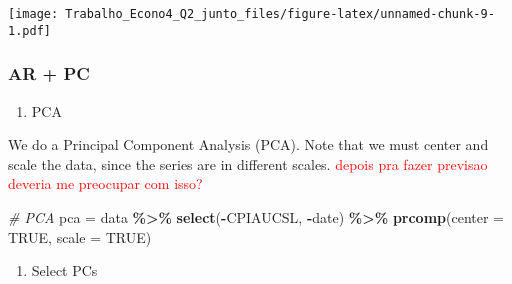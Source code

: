 \documentclass[
]{article}
\newenvironment{Shaded}{\begin{snugshade}}{\end{snugshade}}
\newcommand{\AttributeTok}[1]{\textcolor[rgb]{0.13,0.29,0.53}{#1}}
\newcommand{\CommentTok}[1]{\textcolor[rgb]{0.56,0.35,0.01}{\textit{#1}}}
\newcommand{\ConstantTok}[1]{\textcolor[rgb]{0.56,0.35,0.01}{#1}}
\newcommand{\DecValTok}[1]{\textcolor[rgb]{0.00,0.00,0.81}{#1}}
\newcommand{\FunctionTok}[1]{\textcolor[rgb]{0.13,0.29,0.53}{\textbf{#1}}}
\newcommand{\NormalTok}[1]{#1}
\newcommand{\OtherTok}[1]{\textcolor[rgb]{0.56,0.35,0.01}{#1}}
\newcommand{\SpecialCharTok}[1]{\textcolor[rgb]{0.81,0.36,0.00}{\textbf{#1}}}
\providecommand{\tightlist}{%
  \setlength{\itemsep}{0pt}\setlength{\parskip}{0pt}}
\begin{document}
\begin{Shaded}
\end{Shaded}

\texttt{[image: Trabalho\_Econo4\_Q2\_junto\_files/figure-latex/unnamed-chunk-9-1.pdf]}

\hypertarget{ar-pc}{%
\subsubsection{AR + PC}\label{ar-pc}}

\begin{enumerate}
\def\labelenumi{\arabic{enumi}.}
\tightlist
\item
  PCA
\end{enumerate}

We do a Principal Component Analysis (PCA). Note that we must center and
scale the data, since the series are in different scales.
\textcolor{red}{depois pra fazer previsao deveria me preocupar com isso?}

\begin{Shaded}
\begin{Highlighting}[]
\CommentTok{\# PCA}
\NormalTok{pca }\OtherTok{=}\NormalTok{ data }\SpecialCharTok{\%\textgreater{}\%}
    \FunctionTok{select}\NormalTok{(}\SpecialCharTok{{-}}\NormalTok{CPIAUCSL, }\SpecialCharTok{{-}}\NormalTok{date) }\SpecialCharTok{\%\textgreater{}\%}
    \FunctionTok{prcomp}\NormalTok{(}\AttributeTok{center =} \ConstantTok{TRUE}\NormalTok{, }\AttributeTok{scale =} \ConstantTok{TRUE}\NormalTok{)}
\end{Highlighting}
\end{Shaded}

\begin{enumerate}
\def\labelenumi{\arabic{enumi}.}
\setcounter{enumi}{1}
\tightlist
\item
  Select PCs
\end{enumerate}
\end{document}

